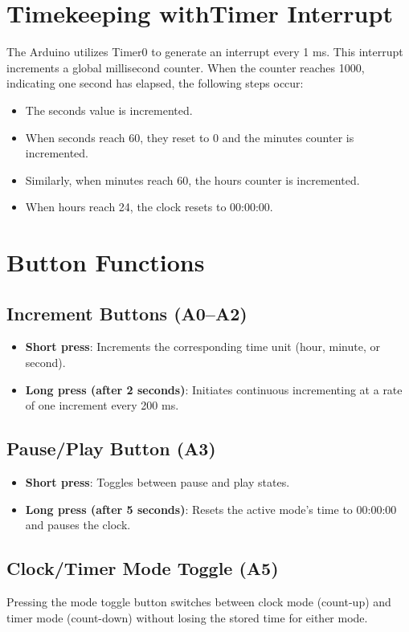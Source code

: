 \documentclass[a4paper,12pt]{article}
\begin{document}
\section{Timekeeping withTimer Interrupt}
The Arduino utilizes Timer0 to generate an interrupt every 1 ms. This interrupt increments a global millisecond counter. When the counter reaches 1000, indicating one second has elapsed, the following steps occur:
\begin{itemize}
    \item The seconds value is incremented.
    \item When seconds reach 60, they reset to 0 and the minutes counter is incremented.
    \item Similarly, when minutes reach 60, the hours counter is incremented.
    \item When hours reach 24, the clock resets to 00:00:00.
\end{itemize}

\section{Button Functions}
\subsection{Increment Buttons (A0--A2)}
\begin{itemize}
    \item \textbf{Short press}: Increments the corresponding time unit (hour, minute, or second).
    \item \textbf{Long press (after 2 seconds)}: Initiates continuous incrementing at a rate of one increment every 200 ms.
\end{itemize}

\subsection{Pause/Play Button (A3)}
\begin{itemize}
    \item \textbf{Short press}: Toggles between pause and play states.
    \item \textbf{Long press (after 5 seconds)}: Resets the active mode's time to 00:00:00 and pauses the clock.
\end{itemize}

\subsection{Clock/Timer Mode Toggle (A5)}
Pressing the mode toggle button switches between clock mode (count-up) and timer mode (count-down) without losing the stored time for either mode.
\end{document}
